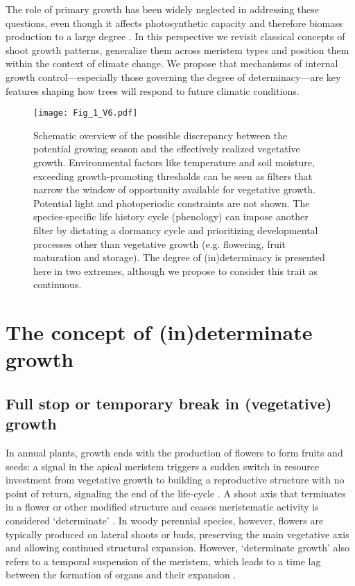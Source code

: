 \documentclass{article}
\begin{document}
		The role of primary growth has been widely neglected in addressing these questions, even though it affects photosynthetic capacity and therefore biomass production to a large degree \citep{girardPolycyclismFundamentalTree2011}. 
		In this perspective we revisit classical concepts of shoot growth patterns, generalize them across meristem types and position them within the context of climate change. We propose that mechanisms of internal growth control---especially those governing the degree of determinacy---are key features shaping how trees will respond to future climatic conditions.
		
								\begin{figure}
								\centering
								\texttt{[image: Fig\_1\_V6.pdf]} 
								\caption{Schematic overview of the possible discrepancy between the potential growing season and the effectively realized vegetative growth. Environmental factors like temperature and soil moisture, exceeding growth-promoting thresholds can be seen as filters that narrow the window of opportunity available for vegetative growth. Potential light and photoperiodic constraints are not shown. The species-specific life history cycle (phenology) can impose another filter by dictating a dormancy cycle and prioritizing developmental processes other than vegetative growth (e.g. flowering, fruit maturation and storage). The degree of (in)determinacy is presented here in two extremes, although we propose to consider this trait as continuous.}
								\label{fig:fig_1xxx}
								\end{figure}
								
\section*{The concept of (in)determinate growth}

	\subsection*{Full stop or temporary break in (vegetative) growth}
	In annual plants, growth ends with the production of flowers to form fruits and seeds: a signal in the apical meristem triggers a sudden switch in resource investment from vegetative growth to building a reproductive structure with no point of return, signaling the end of the life-cycle \citep{poethigPhaseChangeRegulation2003, huijserControlDevelopmentalPhase2011}. A shoot axis that terminates in a flower or other modified structure and ceases meristematic activity is considered `determinate' \citep{barthelemyPlantArchitectureDynamic2007}. In woody perennial species, however, flowers are typically produced on lateral shoots or buds, preserving the main vegetative axis and allowing continued structural expansion. However, `determinate growth' also refers to a temporal suspension of the meristem, which leads to a time lag between the formation of organs and their expansion \citep{kozlowskiSeedGerminationOntogeny2012, halleTropicalTreesForests1978}. 
	
\end{document}
